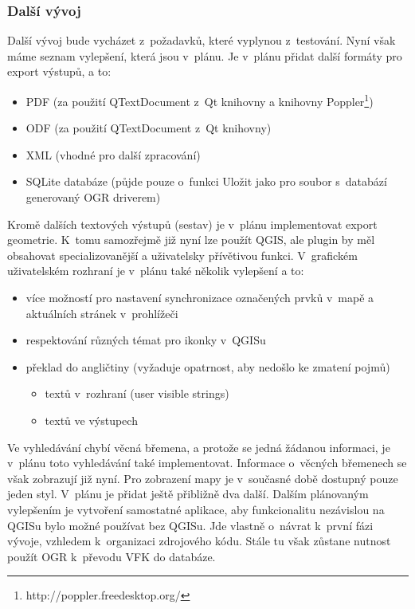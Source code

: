 \documentclass[a4paper,12pt]{article}
\begin{document}
\subsubsection{Další vývoj}
Další vývoj bude vycházet z~požadavků, které vyplynou z~testování. Nyní však máme seznam vylepšení, která jsou v~plánu. Je v~plánu přidat další formáty pro export výstupů, a to:
\begin{itemize}
\item PDF (za použití QTextDocument z~Qt knihovny a knihovny Poppler\footnote{http://poppler.freedesktop.org/})
\item ODF (za použití QTextDocument z~Qt knihovny)
\item XML (vhodné pro další zpracování)
\item SQLite databáze (půjde pouze o~funkci Uložit jako pro soubor s~databází generovaný OGR driverem)
\end{itemize}
Kromě dalších textových výstupů (sestav) je v~plánu implementovat export geometrie.
K~tomu samozřejmě již nyní lze použít QGIS, ale plugin by měl obsahovat specializovanější a uživatelsky přívětivou funkci.
V~grafickém uživatelském rozhraní je v~plánu také několik vylepšení a to:
\begin{itemize}
\item více možností pro nastavení synchronizace označených prvků v~mapě a aktuálních stránek v~prohlížeči
\item respektování různých témat pro ikonky v~QGISu
\item překlad do angličtiny (vyžaduje opatrnost, aby nedošlo ke zmatení pojmů)
    \begin{itemize}
    \item textů v~rozhraní (user visible strings)
    \item textů ve výstupech
    \end{itemize}
\end{itemize}
Ve vyhledávání chybí věcná břemena, a protože se jedná žádanou informaci, je v~plánu toto vyhledávání také implementovat.
Informace o~věcných břemenech se však zobrazují již nyní.
Pro zobrazení mapy je v~současné době dostupný pouze jeden styl.
V~plánu je přidat ještě přibližně dva další.
Dalším plánovaným vylepšením je vytvoření samostatné aplikace, aby funkcionalitu nezávislou na QGISu bylo možné používat bez QGISu.
Jde vlastně o~návrat k~první fázi vývoje, vzhledem k~organizaci zdrojového kódu.
Stále tu však zůstane nutnost použít OGR k~převodu VFK do databáze.
\end{document}
